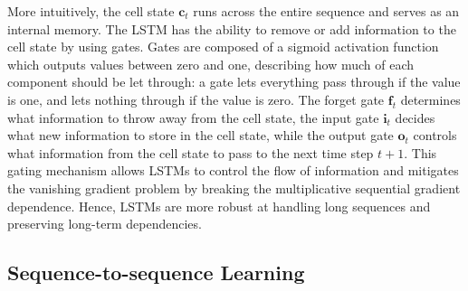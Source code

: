 More intuitively, the cell state $\bm{c}_t$ runs across the entire sequence and serves as an internal memory. The LSTM has the ability to remove or add information to the cell state by using gates. Gates are composed of a sigmoid activation function which outputs values between zero and one, describing how much of each component should be let through: a gate lets everything pass through if the value is one, and lets nothing through if the value is zero. The forget gate $\bm{f}_t$ determines what information to throw away from the cell state, the input gate $\bm{i}_t$ decides what new information to store in the cell state, while the output gate $\bm{o}_t$ controls what information from the cell state to pass to the next time step $t+1$. This gating mechanism allows \acp{LSTM} to control the flow of information and mitigates the vanishing gradient problem by breaking the multiplicative sequential gradient dependence. Hence, \acp{LSTM} are more robust at handling long sequences and preserving long-term dependencies.






\subsection{Sequence-to-sequence Learning}

